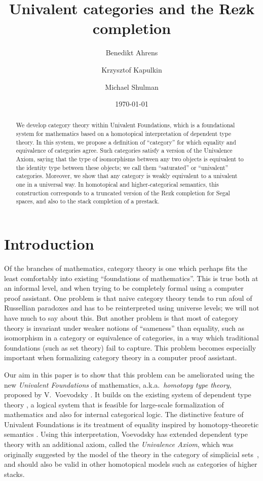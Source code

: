 \documentclass{amsart}
\title{Univalent categories and the Rezk completion}
\author{Benedikt Ahrens}
\author{Krzysztof Kapulkin}
\author{Michael Shulman}
\date{\today}
\theoremstyle{definition}
\theoremstyle{remark}
\numberwithin{equation}{section}
\begin{document}
\begin{abstract}
  We develop category theory within Univalent Foundations, which is a foundational system for mathematics based on a homotopical interpretation of dependent type theory.
  In this system, we propose a definition of ``category'' for which equality and equivalence of categories agree.
  Such categories satisfy a version of the Univalence Axiom, saying that the type of isomorphisms between any two objects is equivalent to the identity type between these objects; we call them ``saturated'' or ``univalent'' categories.
  Moreover, we show that any category is weakly equivalent to a univalent one in a universal way.
  In homotopical and higher-categorical semantics, this construction corresponds to a truncated version of the Rezk completion for Segal spaces, and also to the stack completion of a prestack.
\end{abstract}

\maketitle

\section{Introduction}
\label{sec:introduction}

Of the branches of mathematics, category theory is one which perhaps fits the least comfortably into existing ``foundations of mathematics''.
This is true both at an informal level, and when trying to be completely formal using a computer proof assistant.
One problem is that naive category theory tends to run afoul of Russellian paradoxes and has to be reinterpreted using universe levels; we will not have much to say about this.
But another problem is that most of category theory is invariant under weaker notions of ``sameness'' than equality, such as isomorphism in a category or equivalence of categories, in a way which traditional foundations (such as set theory) fail to capture.
This problem becomes especially important when formalizing category theory in a computer proof assistant.

Our aim in this paper is to show that this problem can be ameliorated using the new \emph{Univalent Foundations} of mathematics, a.k.a.\ \emph{homotopy type theory}, proposed by V.~Voevodsky \cite{vv_uf}.
It builds on the existing system of dependent type theory \cite{martin-lof:bibliopolis, werner:thesis}, a logical system that is feasible for large-scale formalization of mathematics \cite{gonthier:feit-thompson} and also for internal categorical logic.
The distinctive feature of Univalent Foundations is its treatment of equality inspired by homotopy-theoretic semantics \cite{awodey-warren, arndt-kapulkin, warren:thesis, garner-van-den-berg:top-and-simp-models}.
Using this interpretation, Voevodsky has extended dependent type theory with an additional axiom, called the \emph{Univalence Axiom}, which was originally suggested by the model of the theory in the category of simplicial sets~\cite{klv:ssetmodel}, and should also be valid in other homotopical models such as categories of higher stacks.
\end{document}
